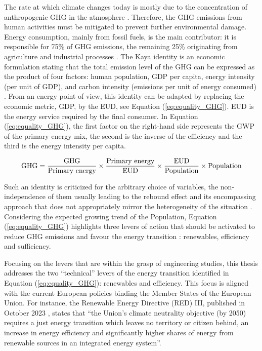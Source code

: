 The rate at which climate changes today is mostly due to the concentration
of anthropogenic \gls{GHG} in the atmosphere \cite{IPCC_CO2_budget}. Therefore, the \gls{GHG} emissions from human activities must be mitigated to prevent further environmental damage. Energy consumption, mainly from fossil fuels, is the main contributor: it is responsible for 75\% of \gls{GHG} emissions, the remaining 25\% originating from agriculture and industrial processes \cite{ourworldindata_CO2_world}. The Kaya identity is an economic formulation stating that the total emission level of the \gls{GHG} can be expressed as the product of four factors: human population, \gls{GDP} per capita, energy intensity (per unit of GDP), and carbon intensity (emissions per unit of energy consumed) \cite{kaya1997environment}. From an energy point of view, this identity can be adapted by replacing the economic metric, \gls{GDP}, by the \gls{EUD}, see Equation (\ref{eq:equality_GHG}). \gls{EUD} is the energy service required by the final consumer. In Equation (\ref{eq:equality_GHG}), the first factor on the right-hand side represents the \gls{GWP} of the primary energy mix, the second is the inverse of the efficiency and the third is the energy intensity per capita.

\begin{equation}
\label{eq:equality_GHG}
\mathrm{GHG} =  \frac{\mathrm{GHG}}{\text{Primary energy}} \times \frac{\text{Primary energy}}{\mathrm{EUD}}\times \frac{\mathrm{EUD}}{\text{Population}} \times \text{Population}\\
 \end{equation}

Such an identity is criticized for the arbitrary choice of variables, the non-independence of them usually leading to the rebound effect and its encompassing approach that does not appropriately mirror the heterogeneity of the situation \cite{IPCC2000}. Considering the expected growing trend of the Population, Equation (\ref{eq:equality_GHG}) highlights three levers of action that should be activated to reduce \gls{GHG} emissions and favour the energy transition \cite{dodson2020population,scovronick2017impact}: renewables, efficiency and sufficiency. 

Focusing on the levers that are within the grasp of engineering studies, this thesis addresses the two ``technical'' levers of the energy transition identified in Equation (\ref{eq:equality_GHG}): renewables and efficiency. This focus is aligned with the current European policies binding the Member States of the European Union. For instance, the Renewable Energy Directive (RED) III, published in October 2023 \cite{REDIII}, states that ``the Union’s climate neutrality objective (by 2050) requires a just energy transition which leaves no territory or citizen behind, an increase in energy efficiency and significantly higher shares of energy from renewable sources in an integrated energy system''.%


